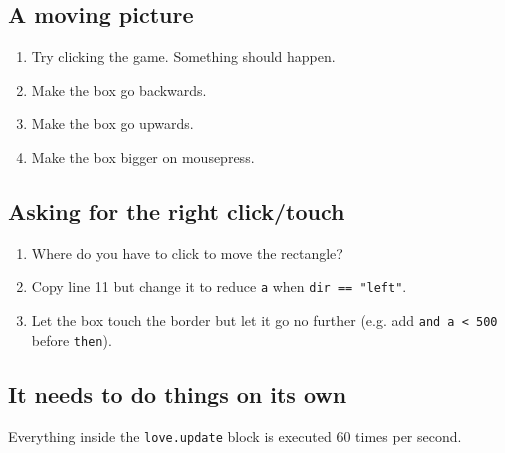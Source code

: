 \documentclass[a4paper, 11pt]{article}
\begin{document}
\subsection{A moving picture}



\begin{enumerate} 
\item Try clicking the game. Something should happen.
\item Make the box go backwards.
\item Make the box go upwards.
\item Make the box bigger on mousepress.
\end{enumerate}

\subsection{Asking for the right click/touch}



\begin{enumerate} 
\item Where do you have to click to move the rectangle?
\item Copy line 11 but change it to reduce \texttt{a} when \texttt{dir == "left"}.
\item Let the box touch the border but let it go no further (e.g. add \texttt{and a < 500} before \texttt{then}).
\end{enumerate}

\subsection{It needs to do things on its own}



Everything inside the \texttt{love.update} block is executed 60 times per second.
\newline
\end{document}
